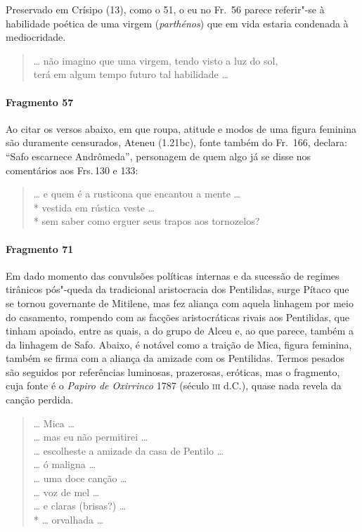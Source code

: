 {\small Preservado em Crísipo (13), como o 51, o eu no Fr.~56 parece referir"-se à habilidade
poética de uma virgem (\textit{parthénos}) que em vida estaria condenada à
mediocridade.}

\begin{verse}
\ldots{} não imagino que uma virgem, tendo visto a luz do sol,\\
terá em algum tempo futuro tal habilidade \ldots{}
\end{verse}

\paragraph{Fragmento 57}

{\small Ao citar os versos abaixo, em que roupa, atitude e modos de uma figura feminina são
duramente censurados, Ateneu (1.21bc), fonte também do Fr.~166, declara: ``Safo
escarnece Andrômeda”, personagem de quem algo já se disse nos comentários aos Frs.\,130 e 133:}

\begin{verse}
\ldots{} e quem é a rusticona que encantou a mente \ldots{}\\*
vestida em rústica veste \ldots{}\\*
sem saber como erguer seus trapos aos tornozelos?
\end{verse}

\paragraph{Fragmento 71}

{\small Em dado momento das convulsões políticas internas e da sucessão de regimes
tirânicos pós"-queda da tradicional aristocracia dos Pentilidas, surge Pítaco que se tornou governante de
Mitilene, mas fez aliança com aquela linhagem por meio do casamento,
rompendo com as facções aristocráticas rivais aos Pentilidas, que tinham apoiado, entre as quais, a
do grupo de Alceu e, ao que parece, também a da linhagem de Safo. Abaixo, é notável como a traição de 
Mica, figura feminina, também se firma com a aliança da amizade com os Pentilidas. Termos
pesados são seguidos por referências luminosas, prazerosas, eróticas, mas o
fragmento, cuja fonte é o \textit{Papiro de Oxirrinco} 1787 (século \textsc{iii} d.C.),
quase nada revela da canção perdida.}

\begin{verse}
\ldots{} Mica \ldots{}\\
\ldots{} mas eu não permitirei \ldots{}\\
\ldots{} escolheste a amizade da casa de Pentilo \ldots{}\\
\ldots{} ó maligna \ldots{}\\
\ldots{} uma doce canção \ldots{}\\
\ldots{} voz de mel \ldots{}\\
\ldots{} e claras (brisas?) \ldots{}\\*
\ldots{} orvalhada \ldots{}
\end{verse}

